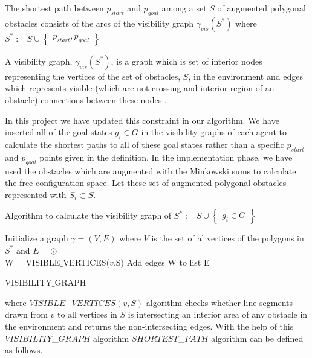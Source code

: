 \begin{displayquote}
The shortest path between $p_{start}$ and $p_{goal}$ among a set $S$ of augmented polygonal obstacles consists of the arcs of the visibility graph $\gamma_{vis}(S^*)$ where $S^* := S \cup \begin{Bmatrix}
p_{start}, p_{goal}
\end{Bmatrix}$
\end{displayquote}

A visibility graph, $\gamma_{vis}(S^*)$, is a graph which is set of interior nodes representing the vertices of the set of obstacles, $S$, in the environment and edges which represents visible (which are not crossing and interior region of an obstacle) connections between these nodes \cite{92}.

In this project we have updated this constraint in our algorithm. We have inserted all of the goal states $g_i \in G$ in the visibility graphs of each agent to calculate the shortest paths to all of these goal states rather than a specific $p_{start}$ and $p_{goal}$ points given in the definition. In the implementation phase, we have used the obstacles which are augmented with the Minkowski sums to calculate the free configuration space. Let these set of augmented polygonal obstacles represented with $S_i \subset S$. 



Algorithm to calculate the visibility graph of  $S^* := S \cup \begin{Bmatrix}
g_i \in G
\end{Bmatrix}$
	
\begin{algorithm}[H]
Initialize a graph $\gamma = (V,E)$ where $V$ is the set of al vertices of the polygons in $S^*$ and $E = \oslash$  \\
{		
W = VISIBLE$\_$VERTICES($v$,S)\;
Add edges W to list E\;
}\

\caption{VISIBILITY$\_$GRAPH}
\end{algorithm}

where $VISIBLE$\_$VERTICES(v,S)$ algorithm checks whether line segments drawn from $v$ to all vertices in $S$ is intersecting an interior area of any obstacle in the environment and returns the non-intersecting edges.  With the help of this $VISIBILITY$\_$GRAPH$ algorithm $SHORTEST$\_$PATH$ algorithm can be defined as follows. \newline
	
